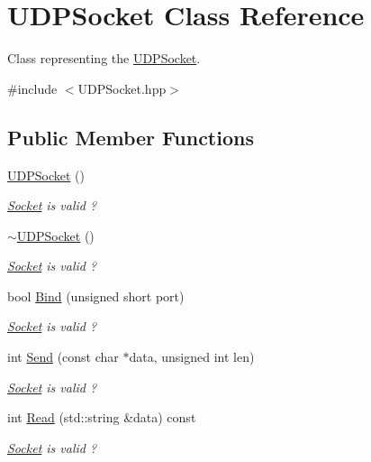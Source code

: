 \hypertarget{class_u_d_p_socket}{}\section{U\+D\+P\+Socket Class Reference}
\label{class_u_d_p_socket}


Class representing the \hyperlink{class_u_d_p_socket}{U\+D\+P\+Socket}.  




{\ttfamily \#include $<$U\+D\+P\+Socket.\+hpp$>$}

\subsection*{Public Member Functions}
\begin{DoxyCompactItemize}
\item 
\hyperlink{class_u_d_p_socket_a4f86f3023f5a08f6355802599a10e100}{U\+D\+P\+Socket} ()
\begin{DoxyCompactList}\small\item\em \hyperlink{class_socket}{Socket} is valid ? \end{DoxyCompactList}\item 
\hyperlink{class_u_d_p_socket_adb1a5254938e5acf5d44ff7a347e9f0a}{$\sim$\+U\+D\+P\+Socket} ()
\begin{DoxyCompactList}\small\item\em \hyperlink{class_socket}{Socket} is valid ? \end{DoxyCompactList}\item 
bool \hyperlink{class_u_d_p_socket_afaaa0a469391a9f9ca9e7cf072f064b6}{Bind} (unsigned short port)
\begin{DoxyCompactList}\small\item\em \hyperlink{class_socket}{Socket} is valid ? \end{DoxyCompactList}\item 
int \hyperlink{class_u_d_p_socket_a7de55d21adc2c0ad135c28eeac4edde9}{Send} (const char $\ast$data, unsigned int len)
\begin{DoxyCompactList}\small\item\em \hyperlink{class_socket}{Socket} is valid ? \end{DoxyCompactList}\item 
int \hyperlink{class_u_d_p_socket_a4a97e4188e1c07646310d390993e93d2}{Read} (std\+::string \&data) const
\begin{DoxyCompactList}\small\item\em \hyperlink{class_socket}{Socket} is valid ? \end{DoxyCompactList}\item 

\end{DoxyCompactItemize}
